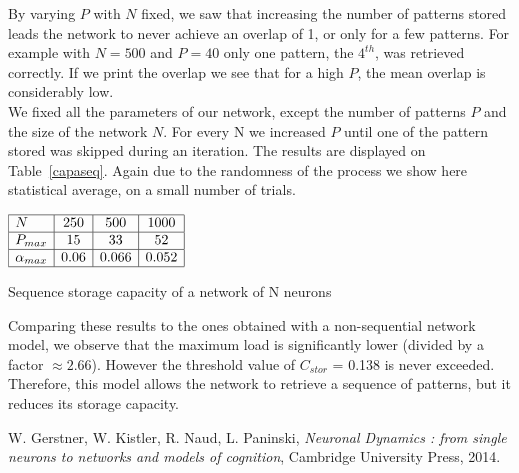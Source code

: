 By varying $P$ with $N$ fixed, we saw that increasing the number of patterns stored leads the network
to never achieve an overlap of 1, or only for a few patterns. For example with $N = 500$ and $P = 40$ only one pattern, the $4^{th}$, was retrieved correctly. If we print the overlap we see that for a high $P$, the mean overlap is considerably low. \\
We fixed all the parameters of our network, except the number of patterns $P$ and the size of the
network $N$. For every N we increased $P$ until one of the pattern stored was skipped during an iteration. The results are displayed on Table~\ref{capaseq}. Again due to the randomness of the process
we show here statistical average, on a small number of trials. 

\begin{table}[h]\label{capaseq}
\begin{center}
\begin{math}
    \begin{array}{|l|c|c|c|}
    \hline
    N & 250 & 500 & 1000 \\ \hline
    P_{max} & 15 & 33 & 52 \\ \hline
    \alpha_{max}& 0.06 & 0.066 & 0.052\\ \hline
    \end{array}
\end{math}
\end{center}
\caption{Sequence storage capacity  of a network of N neurons}
\end{table}
Comparing these results to the ones obtained with a non-sequential network model, we observe that the maximum load is significantly lower (divided by a factor $\approx 2.66$). However the threshold value of  $C_{stor}$ = 0.138 is never exceeded. Therefore, this model allows the network to retrieve a sequence of patterns, but it reduces its storage capacity. 


\begin{thebibliography}{}
 W. Gerstner, W. Kistler, R. Naud, L. Paninski, \textit{Neuronal Dynamics : from single neurons to networks and models of cognition}, Cambridge University Press, 2014.
\end{thebibliography}
